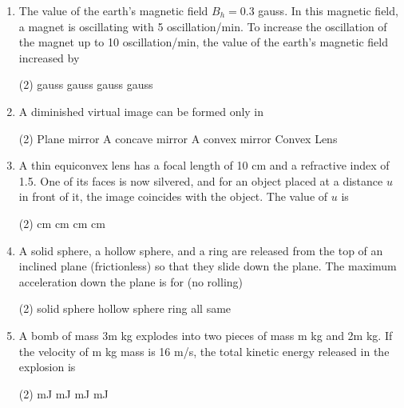 \documentclass[twocolumn]{article}
\begin{document}
\begin{enumerate}
    \begin{tasks}(1)
        \task decrease the number of turns in the coil
        \task decrease the area of cross-section of the coil
        \task increase torsional constant of spiral springs
        \task None of the above
    \end{tasks}
    \item The value of the earth's magnetic field \(B_h = 0.3\) gauss. In this magnetic field, a magnet is oscillating with 5 oscillation/min. To increase the oscillation of the magnet up to 10 oscillation/min, the value of the earth's magnetic field increased by
    \begin{tasks}(2)
         gauss
         gauss
         gauss
         gauss
    \end{tasks}
    \item A diminished virtual image can be formed only in
    \begin{tasks}(2)
        \task Plane mirror
        \task A concave mirror
        \task A convex mirror
        \task Convex Lens
    \end{tasks}
    \item A thin equiconvex lens has a focal length of 10 cm and a refractive index of 1.5. One of its faces is now silvered, and for an object placed at a distance \(u\) in front of it, the image coincides with the object. The value of \(u\) is
    \begin{tasks}(2)
         cm
         cm
         cm
         cm
    \end{tasks}
    \item A solid sphere, a hollow sphere, and a ring are released from the top of an inclined plane (frictionless) so that they slide down the plane. The maximum acceleration down the plane is for (no rolling)
    \begin{tasks}(2)
        \task solid sphere
        \task hollow sphere
        \task ring
        \task all same
    \end{tasks}

    \item A bomb of mass 3m kg explodes into two pieces of mass m kg and 2m kg. If the velocity of m kg mass is 16 m/s, the total kinetic energy released in the explosion is
    \begin{tasks}(2)
         mJ
         mJ
         mJ
         mJ
    \end{tasks}


\end{enumerate}
\end{document}
